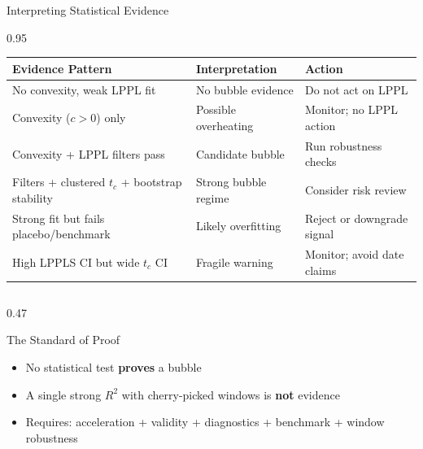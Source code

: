 \documentclass[9pt, aspectratio=169, t]{beamer}
\begin{document}
\begin{frame}{Interpreting Statistical Evidence}
    \begin{cminipage}{0.95\textwidth}
    {\scriptsize
    \begin{center}
        \begin{tabular}{p{4.8cm}p{3cm}p{4cm}}
            \toprule
            \textbf{Evidence Pattern} & \textbf{Interpretation} & \textbf{Action} \\
            \midrule
            No convexity, weak LPPL fit & No bubble evidence & Do not act on LPPL \\
            \addlinespace
            Convexity ($c>0$) only & Possible overheating & Monitor; no LPPL action \\
            \addlinespace
            Convexity + LPPL filters pass & Candidate bubble & Run robustness checks \\
            \addlinespace
            Filters + clustered $t_c$ + bootstrap stability & Strong bubble regime & Consider risk review \\
            \addlinespace
            Strong fit but fails placebo/benchmark & Likely overfitting & Reject or downgrade signal \\
            \addlinespace
            High LPPLS CI but wide $t_c$ CI & Fragile warning & Monitor; avoid date claims \\
            \bottomrule
        \end{tabular}
    \end{center}
    \vspace{-1mm}
    \begin{columns}[T]
        \begin{column}{0.47\textwidth}
            \begin{alertblock}{The Standard of Proof}
                \begin{itemize}\setlength{\itemsep}{0pt}
                    \item No statistical test \textbf{proves} a bubble
                    \item A single strong $R^2$ with cherry-picked windows is \textbf{not} evidence
                    \item Requires: acceleration + validity + diagnostics + benchmark + window robustness
                \end{itemize}
            \end{alertblock}
        \end{column}
    \end{columns}
    }
    \end{cminipage}
\end{frame}
\end{document}
